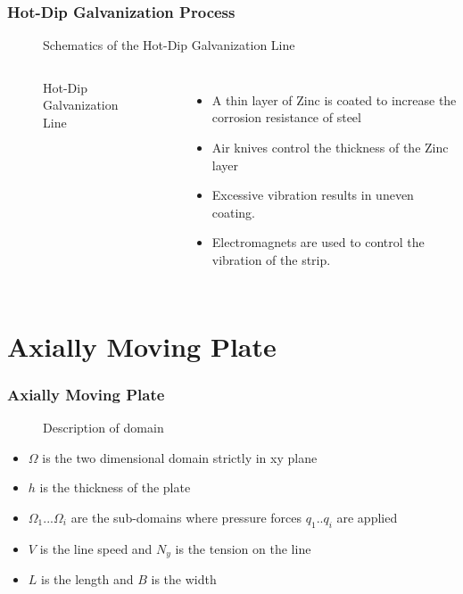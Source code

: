 \documentclass[9pt]{beamer}
\begin{document}
\begin{frame}
\frametitle{Hot-Dip Galvanization Process}
\begin{figure}
\centering
\subfloat{} 
\caption{Schematics of the Hot-Dip Galvanization Line}
\end{figure}
\end{frame}




\begin{frame}
\begin{columns}
\begin{figure}

\centering
\subfloat{} 
\caption{Hot-Dip Galvanization Line}
\end{figure}
\begin{itemize}
\item A thin layer of Zinc is coated to increase the corrosion resistance of steel
\item Air knives control the thickness of the Zinc layer
\item Excessive vibration results in uneven coating.
\item Electromagnets are used to control the  vibration of the strip. 
\end{itemize}
\end{columns}
\end{frame}


\section{Axially Moving Plate}
\begin{frame}\frametitle{Axially Moving Plate}

\begin{figure}[ht!]
\centering
\caption{Description of domain}
\label{fig:Domain}
\end{figure}
\begin{itemize}

\item $\Omega$ is the two dimensional domain strictly in xy plane 
\item $h$ is the thickness of the plate 
\item $\Omega_1$...$\Omega_i$ are the sub-domains where pressure forces $q_1$..$q_i$ are applied
\item $V$ is the line speed and  $N_y$ is the tension on the line
\item $L$ is the length and  $B$ is the width 

\end{itemize}




\end{frame}
\end{document}
